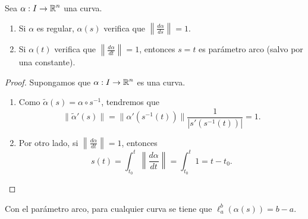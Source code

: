 \begin{prop}
	Sea $\displaystyle \alpha : I \to \mathbb{R}^{n} $ una curva. 
	\begin{enumerate}
	\item Si $\displaystyle \alpha  $ es regular, $\displaystyle \alpha\left(s\right) $ verifica que $\displaystyle \left\|\frac{d \alpha }{d s}\right\| =1$.
	\item Si $\displaystyle \alpha\left(t\right) $ verifica que $\displaystyle \left\|\frac{d\alpha }{dt}\right\| =1$, entonces $\displaystyle s = t $ es parámetro arco (salvo por una constante).
	\end{enumerate}
\end{prop}
\begin{proof}
	Supongamos que $\displaystyle \alpha : I \to \mathbb{R}^{n} $ es una curva.
	\begin{enumerate}
		\item Como $\displaystyle \tilde{\alpha}\left(s\right)=\alpha \circ s^{-1} $, tendremos que 
			\[ \|\tilde{\alpha}'\left(s\right)\| = \|\alpha'\left(s^{-1}\left(t\right)\right)\|\frac{1}{ \left|s'\left(s^{-1}\left(t\right)\right)\right|} = 1 .\]
\item Por otro lado, si $\displaystyle \left\|\frac{d\alpha }{dt}\right\| = 1 $, entonces
\[s\left(t\right)=\int^{t}_{t_{0}} \left\|\frac{d\alpha }{dt}\right\| = \int^{t}_{t_{0}} 1 =t-t_{0} .\]
	\end{enumerate}
\end{proof}
\begin{observation}
Con el parámetro arco, para cualquier curva se tiene que $\displaystyle \ell^{b}_{a}\left(\alpha\left(s\right)\right) = b-a $. 
\end{observation}
